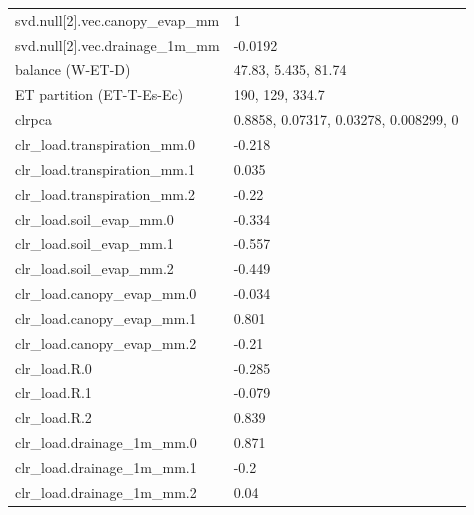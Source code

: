 {\begin{longtable}{p{}p{}}
{}svd.null[2].vec.canopy\_evap\_mm & 1\\
{}svd.null[2].vec.drainage\_1m\_mm & -0.0192\\
{}balance (W-ET-D) & 47.83, 5.435, 81.74\\
{}ET partition (ET-T-Es-Ec) & 190, 129, 334.7\\
{}clrpca & 0.8858, 0.07317, 0.03278, 0.008299, 0\\
{}clr\_load.transpiration\_mm.0 & -0.218\\
{}clr\_load.transpiration\_mm.1 & 0.035\\
{}clr\_load.transpiration\_mm.2 & -0.22\\
{}clr\_load.soil\_evap\_mm.0 & -0.334\\
{}clr\_load.soil\_evap\_mm.1 & -0.557\\
{}clr\_load.soil\_evap\_mm.2 & -0.449\\
{}clr\_load.canopy\_evap\_mm.0 & -0.034\\
{}clr\_load.canopy\_evap\_mm.1 & 0.801\\
{}clr\_load.canopy\_evap\_mm.2 & -0.21\\
{}clr\_load.R.0 & -0.285\\
{}clr\_load.R.1 & -0.079\\
{}clr\_load.R.2 & 0.839\\
{}clr\_load.drainage\_1m\_mm.0 & 0.871\\
{}clr\_load.drainage\_1m\_mm.1 & -0.2\\
{}clr\_load.drainage\_1m\_mm.2 & 0.04\\
\bottomrule\end{longtable}}

